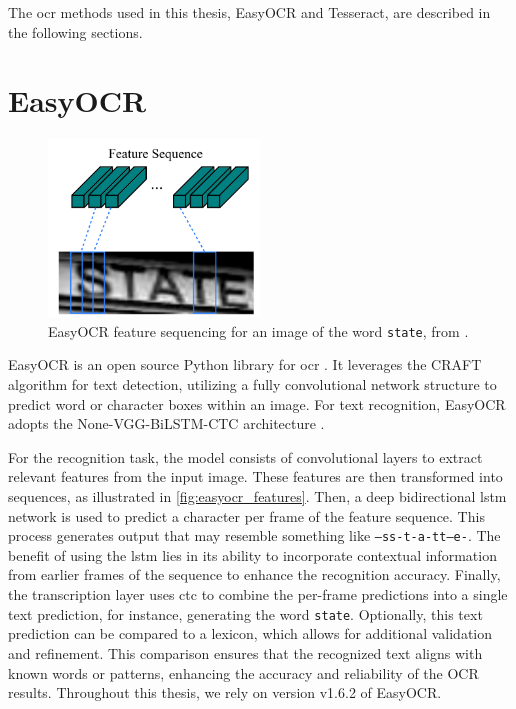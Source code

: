 The \gls{ocr} methods used in this thesis, EasyOCR and Tesseract, are described in the following sections.

\section{EasyOCR}
\label{subsec:easyocr}

\begin{figure}[h!]
    \centering
    \includegraphics[width=0.5\textwidth]{../images/external/crnn_features.png}
    \caption{EasyOCR feature sequencing for an image of the word \texttt{state}, from \cite{easyocr_2020}.}
    \label{fig:easyocr_features}
\end{figure}

EasyOCR is an open source Python library for \gls{ocr} \cite{easyocr_gitub_2020}.
It leverages the CRAFT algorithm \cite{craft_2019} for text detection, utilizing a fully convolutional network structure to predict word or character boxes within an image.
For text recognition, EasyOCR adopts the None-VGG-BiLSTM-CTC architecture \cite{crnn_2015}.

For the recognition task, the model consists of convolutional layers to extract relevant features from the input image.
These features are then transformed into sequences, as illustrated in \autoref{fig:easyocr_features}.
Then, a deep bidirectional \gls{lstm} network is used to predict a character per frame of the feature sequence.
This process generates output that may resemble something like \texttt{--ss-t-a-tt--e-}.
The benefit of using the \gls{lstm} lies in its ability to incorporate contextual information from earlier frames of the sequence to enhance the recognition accuracy.
Finally, the transcription layer uses \gls{ctc} to combine the per-frame predictions into a single text prediction, for instance, generating the word \texttt{state}.
Optionally, this text prediction can be compared to a lexicon, which allows for additional validation and refinement.
This comparison ensures that the recognized text aligns with known words or patterns, enhancing the accuracy and reliability of the OCR results.
Throughout this thesis, we rely on version v1.6.2 of EasyOCR.


